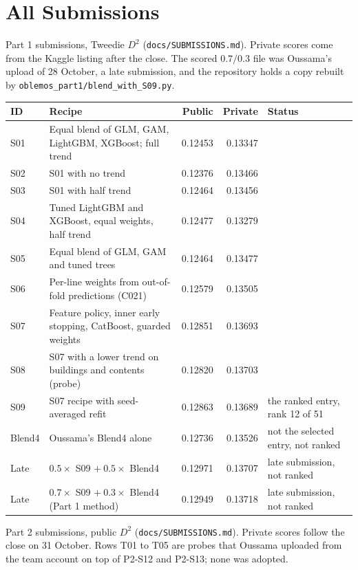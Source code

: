 \clearpage
\section{All Submissions}
\label{ov:app-sub}

Part 1 submissions, Tweedie $D^2$ (\texttt{docs/SUBMISSIONS.md}). Private scores come from the Kaggle listing after the
close. The scored $0.7/0.3$ file was Oussama's upload of 28 October, a late submission, and the repository holds a
copy rebuilt by
\texttt{oblemos\_part1/blend\_with\_S09.py}.

\begin{center}
\small
\begin{tabular}{lp{5.2cm}rrp{3.4cm}}
\hline
ID & Recipe & Public & Private & Status\\
\hline
S01 & Equal blend of GLM, GAM, LightGBM, XGBoost; full trend & 0.12453 & 0.13347 & \\
S02 & S01 with no trend & 0.12376 & 0.13466 & \\
S03 & S01 with half trend & 0.12464 & 0.13456 & \\
S04 & Tuned LightGBM and XGBoost, equal weights, half trend & 0.12477 & 0.13279 & \\
S05 & Equal blend of GLM, GAM and tuned trees & 0.12464 & 0.13477 & \\
S06 & Per-line weights from out-of-fold predictions (C021) & 0.12579 & 0.13505 & \\
S07 & Feature policy, inner early stopping, CatBoost, guarded weights & 0.12851 & 0.13693 & \\
S08 & S07 with a lower trend on buildings and contents (probe) & 0.12820 & 0.13703 & \\
S09 & S07 recipe with seed-averaged refit & 0.12863 & 0.13689 & the ranked entry, rank 12 of 51\\
Blend4 & Oussama's Blend4 alone & 0.12736 & 0.13526 & not the selected entry, not ranked\\
Late & $0.5\times$ S09 $+\ 0.5\times$ Blend4 & 0.12971 & 0.13707 & late submission, not ranked\\
Late & $0.7\times$ S09 $+\ 0.3\times$ Blend4 (Part 1 method) & 0.12949 & 0.13718 & late submission, not ranked\\
\hline
\end{tabular}
\end{center}

Part 2 submissions, public $D^2$ (\texttt{docs/SUBMISSIONS.md}). Private scores follow the close on 31 October. Rows
T01 to T05 are probes that Oussama uploaded from the team account on top of P2-S12 and P2-S13; none was adopted.

